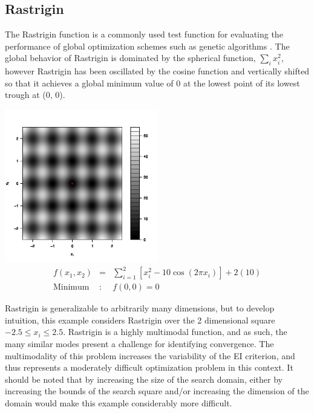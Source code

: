 \documentclass[12pt]{article}
\begin{document}
%
%
\subsection{Rastrigin}
%
%

%
The Rastrigin function is a commonly used test function for evaluating the performance of global optimization schemes such as genetic algorithms \citep{rastCite}.
%
The global behavior of Rastrigin is dominated by the spherical function, $\sum_i x_i^2$, however Rastrigin has been oscillated by the cosine function and vertically shifted so that it achieves a global minimum value of 0 at the lowest point of its lowest trough at (0, 0).

%
%
\begin{center}
        \includegraphics[width=0.5\textwidth]{./figures/rastContourBW.jpg}
        \begin{eqnarray}
        f(x_1, x_2) &=& \sum_{i=1}^2\left[x_i^2-10\cos(2\pi x_i)\right] + 2(10)\\
        \label{rastEq}
        \text{Minimum}&:& f(0, 0)=0\nonumber
        \end{eqnarray}
\end{center}
%
%

%
Rastrigin is generalizable to arbitrarily many dimensions, but to develop intuition, this example considers Rastrigin over the 2 dimensional square $-2.5\le x_i\le 2.5$.
%
Rastrigin is a highly multimodal function, and as such, the many similar modes present a challenge for identifying convergence.
%
The multimodality of this problem increases the variability of the EI criterion, and thus represents a moderately difficult optimization problem in this context. 
%
It should be noted that by increasing the size of the search domain, either by increasing the bounds of the search square and/or increasing the dimension of the domain would make this example considerably more difficult. %
\end{document}
